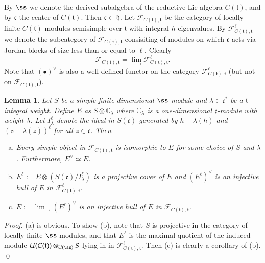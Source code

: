 \documentclass{tglat2e}
\newtheorem{lemma}[theorem]{Lemma}
\theoremstyle{definition}
\theoremstyle{remark}
\newcommand{\cc}{\mathfrak{c}}
\renewcommand{\tt}{\mathfrak{t}}
\newcommand{\hh}{\mathfrak{h}}
\renewcommand{\gg}{\mathfrak{g}}
\newcommand{\FF}{\mathcal{F}}
\begin{document}
By $\ss$ we denote the derived subalgebra of the reductive Lie algebra $C(\tt)$, and by $\cc$ the center of $C(\tt)$.
Then $\cc\subset \hh$.
Let $\FF_{C(\tt),\tt}$ be the category of locally finite $C(\tt)$-modules semisimple over $\tt$ with integral $h$-eigenvalues. 
By  $\FF^\ell_{C(\tt),\tt}$ we denote the subcategory of $\FF_{C(\tt),\tt}$ consisiting of modules on which $\cc$ acts via Jordan blocks of size less than or equal to $\ell$.
Clearly
$$\FF_{C(\tt),\tt}=\lim_{\longrightarrow}\FF^\ell_{C(\tt),\tt}.$$
Note that $({\bullet})^\vee$ is also a well-defined functor on the category $\FF^\ell_{C(\tt),\tt}$ (but not on $\mathcal{F}_{C(\tt),\tt}$).

\begin{lemma}\label{small} Let $S$ be a simple finite-dimensional $\ss$-module and $\lambda\in\cc^*$ be a $\tt$-integral weight. 
Define $E$ as $S\otimes \mathbb{C}_\lambda$ where $\mathbb{C}_\lambda$ is a one-dimensional $\cc$-module with weight $\lambda$. Let $I_\lambda^{\ell}$ denote the ideal in $S(\cc)$ generated by
$h-\lambda(h)$ and $(z-\lambda(z))^\ell$ for all $z\in\cc$. Then 
\begin{enumerate}[a)]
\item Every simple object in $\FF_{C(\tt),\tt}$ is isomorphic to $E$ for some choice of $S$ and $\lambda$. Furthermore, $E^\vee\simeq E$. 
\item $E^\ell:=E\otimes (S(\cc)/I_\lambda^\ell)$ is a projective cover of $E$ and $\left(E^\ell\right)^\vee$ is an injective hull of $E$ in $\FF^\ell_{C(\tt),\tt}$.
\item $\bar E:=\displaystyle \lim_{\longrightarrow} \left(E^\ell\right)^\vee$ is an injective hull of $E$ in $\FF_{C(\tt),\tt}$.
\end{enumerate}
\label{lem:lem_inj_hull}
\end{lemma}
\begin{proof} (a) is obvious. To show (b), note that $S$ is projective in the category of locally finite $\ss$-modules, and that $E^\ell$ is the maximal quotient of
the induced module $U(C(\tt))\otimes_{U(\ss)}S$ lying in in $\FF^\ell_{C(\tt),\tt}$. Then (c) is clearly a corollary of (b).
\qed\end{proof}



	
	
\end{document}
